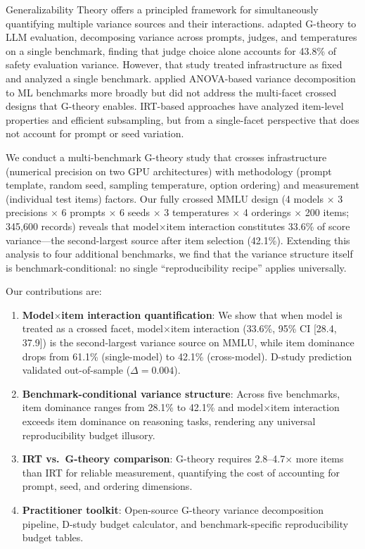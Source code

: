 \documentclass[11pt,letterpaper]{article}
\begin{document}
Generalizability Theory \citep[G-theory;][]{shavelson1991generalizability,brennan2001generalizability} offers a principled framework for simultaneously quantifying multiple variance sources and their interactions. \citet{mesting2026} adapted G-theory to LLM evaluation, decomposing variance across prompts, judges, and temperatures on a single benchmark, finding that judge choice alone accounts for 43.8\% of safety evaluation variance. However, that study treated infrastructure as fixed and analyzed a single benchmark. \citet{bouthillier2021accounting} applied ANOVA-based variance decomposition to ML benchmarks more broadly but did not address the multi-facet crossed designs that G-theory enables. IRT-based approaches \citep{lalor2019learning,rodriguez2021evaluation,polo2024tinybenchmarks} have analyzed item-level properties and efficient subsampling, but from a single-facet perspective that does not account for prompt or seed variation.

We conduct a multi-benchmark G-theory study that crosses infrastructure (numerical precision on two GPU architectures) with methodology (prompt template, random seed, sampling temperature, option ordering) and measurement (individual test items) factors. Our fully crossed MMLU design (4 models $\times$ 3 precisions $\times$ 6 prompts $\times$ 6 seeds $\times$ 3 temperatures $\times$ 4 orderings $\times$ 200 items; 345,600 records) reveals that model$\times$item interaction constitutes 33.6\% of score variance---the second-largest source after item selection (42.1\%). Extending this analysis to four additional benchmarks, we find that the variance structure itself is benchmark-conditional: no single ``reproducibility recipe'' applies universally.

Our contributions are:
\begin{enumerate}
\item \textbf{Model$\times$item interaction quantification}: We show that when model is treated as a crossed facet, model$\times$item interaction (33.6\%, 95\% CI [28.4, 37.9]) is the second-largest variance source on MMLU, while item dominance drops from 61.1\% (single-model) to 42.1\% (cross-model). D-study prediction validated out-of-sample ($\Delta=0.004$).
\item \textbf{Benchmark-conditional variance structure}: Across five benchmarks, item dominance ranges from 28.1\% to 42.1\% and model$\times$item interaction exceeds item dominance on reasoning tasks, rendering any universal reproducibility budget illusory.
\item \textbf{IRT vs.\ G-theory comparison}: G-theory requires 2.8--4.7$\times$ more items than IRT for reliable measurement, quantifying the cost of accounting for prompt, seed, and ordering dimensions.
\item \textbf{Practitioner toolkit}: Open-source G-theory variance decomposition pipeline, D-study budget calculator, and benchmark-specific reproducibility budget tables.
\end{enumerate}
\end{document}
